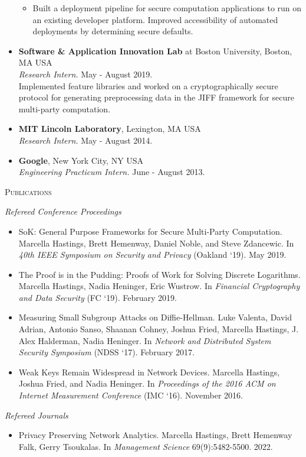 \documentclass{article}
\begin{document}
\begin{itemize}[label={}, topsep=0pt]
\begin{itemize}[leftmargin=*, noitemsep, topsep=0pt, partopsep=0pt]
    \item Built a deployment pipeline for secure computation applications to run on an existing developer platform. Improved accessibility of automated deployments by determining secure defaults.
  \end{itemize}
  \item \textbf{Software \& Application Innovation Lab} at Boston University, Boston, MA USA\\
  \textit{Research Intern.} May - August 2019.\\
  Implemented feature libraries and worked on a cryptographically secure protocol for generating preprocessing data in the JIFF framework for secure multi-party computation.
  \item \textbf{MIT Lincoln Laboratory}, Lexington, MA USA\\
  \textit{Research Intern.} May - August 2014.
  \item \textbf{Google}, New York City, NY USA\\
  \textit{Engineering Practicum Intern.} June - August 2013.\\
\end{itemize}

\textsc{Publications}

\textit{Refereed Conference Proceedings}
\begin{itemize}[label={}]
\item SoK: General Purpose Frameworks for Secure Multi-Party Computation. 
Marcella Hastings, Brett Hemenway, Daniel Noble, and Steve Zdancewic.
In \textit{40th IEEE Symposium on Security and Privacy} (Oakland `19). May 2019.
\item The Proof is in the Pudding: Proofs of Work for Solving Discrete Logarithms.
Marcella Hastings, Nadia Heninger, Eric Wustrow.
In \emph{Financial Cryptography and Data Security} (FC `19). February 2019.
\item Measuring Small Subgroup Attacks on Diffie-Hellman. 
Luke Valenta, David Adrian, Antonio Sanso, Shaanan Cohney, Joshua Fried, Marcella Hastings, J. Alex Halderman, Nadia Heninger. 
In \textit{Network and Distributed System Security Symposium} (NDSS `17). February 2017.
\item Weak Keys Remain Widespread in Network Devices. 
Marcella Hastings, Joshua Fried, and Nadia Heninger. 
In \textit{Proceedings of the 2016 ACM on Internet Measurement Conference} (IMC `16). November 2016.
\end{itemize}

\textit{Refereed Journals}
\begin{itemize}[label={}]
\item Privacy Preserving Network Analytics. Marcella Hastings, Brett Hemenway Falk, Gerry Tsoukalas.
In \textit{Management Science} 69(9):5482-5500. 2022.
\end{itemize}
\end{document}
